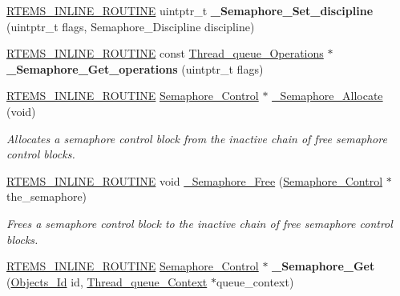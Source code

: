 \begin{DoxyCompactItemize}
\item 
\mbox{\label{group__ClassicSemImpl_ga7daf2d4c6ffca0ed33db941b7cb1f947}} 
\mbox{\hyperlink{group__RTEMSScoreBaseDefs_gac216239df231d5dbd15e3520b0b9313f}{R\+T\+E\+M\+S\+\_\+\+I\+N\+L\+I\+N\+E\+\_\+\+R\+O\+U\+T\+I\+NE}} uintptr\+\_\+t {\bfseries \+\_\+\+Semaphore\+\_\+\+Set\+\_\+discipline} (uintptr\+\_\+t flags, Semaphore\+\_\+\+Discipline discipline)
\item 
\mbox{\label{group__ClassicSemImpl_gad1217677403f3b51b5b61a546c542e72}} 
\mbox{\hyperlink{group__RTEMSScoreBaseDefs_gac216239df231d5dbd15e3520b0b9313f}{R\+T\+E\+M\+S\+\_\+\+I\+N\+L\+I\+N\+E\+\_\+\+R\+O\+U\+T\+I\+NE}} const \mbox{\hyperlink{structThread__queue__Operations}{Thread\+\_\+queue\+\_\+\+Operations}} $\ast$ {\bfseries \+\_\+\+Semaphore\+\_\+\+Get\+\_\+operations} (uintptr\+\_\+t flags)
\item 
\mbox{\hyperlink{group__RTEMSScoreBaseDefs_gac216239df231d5dbd15e3520b0b9313f}{R\+T\+E\+M\+S\+\_\+\+I\+N\+L\+I\+N\+E\+\_\+\+R\+O\+U\+T\+I\+NE}} \mbox{\hyperlink{structSemaphore__Control}{Semaphore\+\_\+\+Control}} $\ast$ \mbox{\hyperlink{group__ClassicSemImpl_gad485fdb4409216acbb4e339c2fd57889}{\+\_\+\+Semaphore\+\_\+\+Allocate}} (void)
\begin{DoxyCompactList}\small\item\em Allocates a semaphore control block from the inactive chain of free semaphore control blocks. \end{DoxyCompactList}\item 
\mbox{\hyperlink{group__RTEMSScoreBaseDefs_gac216239df231d5dbd15e3520b0b9313f}{R\+T\+E\+M\+S\+\_\+\+I\+N\+L\+I\+N\+E\+\_\+\+R\+O\+U\+T\+I\+NE}} void \mbox{\hyperlink{group__ClassicSemImpl_gaca8f9ddbc112fe16432cd255527af303}{\+\_\+\+Semaphore\+\_\+\+Free}} (\mbox{\hyperlink{structSemaphore__Control}{Semaphore\+\_\+\+Control}} $\ast$the\+\_\+semaphore)
\begin{DoxyCompactList}\small\item\em Frees a semaphore control block to the inactive chain of free semaphore control blocks. \end{DoxyCompactList}\item 
\mbox{\label{group__ClassicSemImpl_gae6c81c48866b311568aeb67633d934ef}} 
\mbox{\hyperlink{group__RTEMSScoreBaseDefs_gac216239df231d5dbd15e3520b0b9313f}{R\+T\+E\+M\+S\+\_\+\+I\+N\+L\+I\+N\+E\+\_\+\+R\+O\+U\+T\+I\+NE}} \mbox{\hyperlink{structSemaphore__Control}{Semaphore\+\_\+\+Control}} $\ast$ {\bfseries \+\_\+\+Semaphore\+\_\+\+Get} (\mbox{\hyperlink{group__RTEMSScoreObject_ga5821f52a51072941bdd603e542d0863e}{Objects\+\_\+\+Id}} id, \mbox{\hyperlink{structThread__queue__Context}{Thread\+\_\+queue\+\_\+\+Context}} $\ast$queue\+\_\+context)
\end{DoxyCompactItemize}

